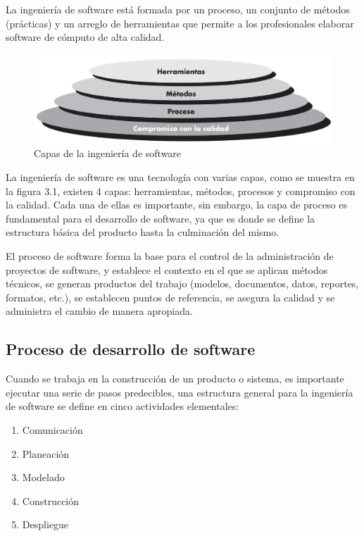 La ingeniería de software está formada por un proceso, un conjunto de métodos (prácticas) y un arreglo de herramientas que permite a los profesionales elaborar software de cómputo de alta calidad. 

\begin{figure}[H]
	\begin{center}
		\includegraphics[width=.95\textwidth]{images/CapasIS}
		\caption{Capas de la ingeniería de software}
		\label{fig:capas_is}
	\end{center}
\end{figure}

La ingeniería de software es una tecnología con varias capas, como se muestra en la figura 3.1, existen 4 capas: herramientas, métodos, procesos y compromiso con la calidad. Cada una de ellas es importante, sin embargo, la capa de proceso es fundamental para el desarrollo de software, ya que es donde se define la estructura básica del producto hasta la culminación del mismo.

El proceso de software forma la base para el control de la administración de proyectos de software, y establece el contexto en el que se aplican métodos técnicos, se generan productos del trabajo (modelos, documentos, datos, reportes, formatos, etc.), se establecen puntos de referencia, se asegura la calidad y se administra el cambio de manera apropiada.

\subsection{Proceso de desarrollo de software}

Cuando se trabaja en la construcción de un producto o sistema, es importante ejecutar una serie de pasos predecibles, una estructura general para la ingeniería de software se define en cinco actividades elementales:

\begin{enumerate}
	\item Comunicación
	\item Planeación
	\item Modelado
	\item Construcción
	\item Despliegue
\end{enumerate}

